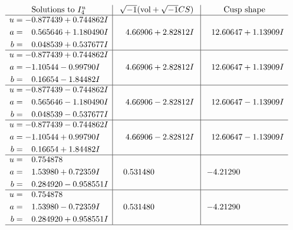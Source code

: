 \documentclass[1p]{elsarticle_modified}
\theoremstyle{definition}
\newcommand{\I}{\sqrt{-1}}
\begin{document}
$$\begin{array}{c|c|c}  
\text{Solutions to }I^u_{4}& \I (\text{vol} + \sqrt{-1}CS) & \text{Cusp shape}\\
 \hline 
\begin{aligned}
u &= -0.877439 + 0.744862 I \\
a &= \phantom{-}0.565646 + 1.180490 I \\
b &= \phantom{-}0.048539 + 0.537677 I\end{aligned}
 & \phantom{-}4.66906 + 2.82812 I & \phantom{-}12.60647 + 1.13909 I \\ \hline\begin{aligned}
u &= -0.877439 + 0.744862 I \\
a &= -1.10544 - 0.99790 I \\
b &= \phantom{-}0.16654 - 1.84482 I\end{aligned}
 & \phantom{-}4.66906 + 2.82812 I & \phantom{-}12.60647 + 1.13909 I \\ \hline\begin{aligned}
u &= -0.877439 - 0.744862 I \\
a &= \phantom{-}0.565646 - 1.180490 I \\
b &= \phantom{-}0.048539 - 0.537677 I\end{aligned}
 & \phantom{-}4.66906 - 2.82812 I & \phantom{-}12.60647 - 1.13909 I \\ \hline\begin{aligned}
u &= -0.877439 - 0.744862 I \\
a &= -1.10544 + 0.99790 I \\
b &= \phantom{-}0.16654 + 1.84482 I\end{aligned}
 & \phantom{-}4.66906 - 2.82812 I & \phantom{-}12.60647 - 1.13909 I \\ \hline\begin{aligned}
u &= \phantom{-}0.754878\phantom{ +0.000000I} \\
a &= \phantom{-}1.53980 + 0.72359 I \\
b &= \phantom{-}0.284920 - 0.958551 I\end{aligned}
 & \phantom{-}0.531480\phantom{ +0.000000I} & -4.21290\phantom{ +0.000000I} \\ \hline\begin{aligned}
u &= \phantom{-}0.754878\phantom{ +0.000000I} \\
a &= \phantom{-}1.53980 - 0.72359 I \\
b &= \phantom{-}0.284920 + 0.958551 I\end{aligned}
 & \phantom{-}0.531480\phantom{ +0.000000I} & -4.21290\phantom{ +0.000000I}\\
 \hline 
 \end{array}$$\newpage
\end{document}
